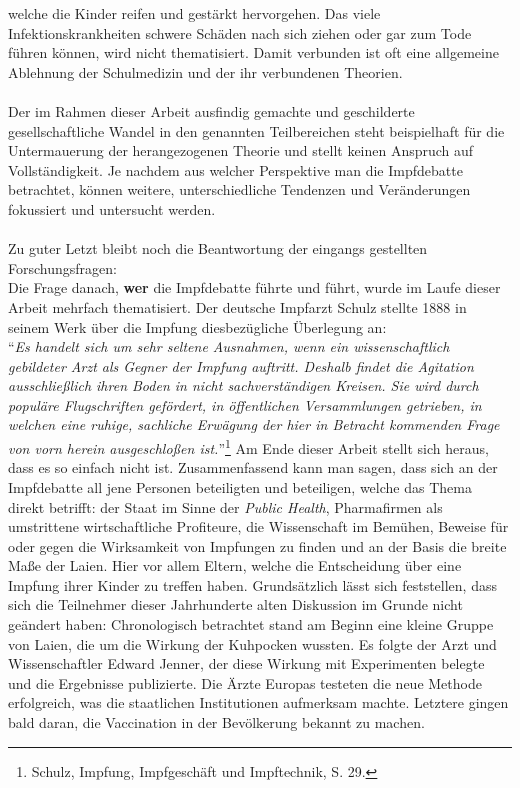 \documentclass[
    a4paper,
    12pt,
    hyphens,
    chapterprefix=true,
    headheight=33pt,
    footheight=29pt,
    headings=optiontohead, %
]{scrartcl}
\begin{document}
{welche die Kinder reifen und gestärkt hervorgehen. Das viele 
Infektionskrankheiten schwere Schäden nach sich ziehen oder gar zum 
Tode führen können, wird nicht thematisiert. Damit verbunden ist oft eine 
allgemeine Ablehnung der Schulmedizin und der ihr verbundenen Theorien. \\
\\
Der im Rahmen dieser Arbeit ausfindig gemachte und geschilderte gesellschaftliche Wandel in den genannten Teilbereichen steht beispielhaft für die Untermauerung der herangezogenen Theorie und stellt keinen Anspruch auf Vollständigkeit. Je nachdem aus welcher Perspektive man die Impfdebatte betrachtet, können weitere, unterschiedliche Tendenzen und Veränderungen fokussiert und untersucht werden. \\
\\ 
Zu guter Letzt bleibt noch die Beantwortung der eingangs gestellten Forschungsfragen:\\
Die Frage danach, \textbf{wer} die Impfdebatte führte und führt, wurde im Laufe dieser Arbeit mehrfach  thematisiert. Der deutsche Impfarzt Schulz stellte 1888 in seinem Werk über die Impfung diesbezügliche Überlegung an:\\
"`\textit{Es handelt sich um sehr seltene Ausnahmen, wenn ein wissenschaftlich gebildeter Arzt als Gegner der Impfung auftritt. Deshalb findet die Agitation ausschließlich ihren Boden in nicht sachverständigen Kreisen. Sie wird durch populäre Flugschriften gefördert, in öffentlichen Versammlungen getrieben, in welchen eine ruhige, sachliche Erwägung der hier in Betracht kommenden Frage von vorn herein ausgeschloßen ist.}"'\footnote{Schulz, Impfung, Impfgeschäft und Impftechnik, S. 29.} 
Am Ende dieser Arbeit stellt sich heraus, dass es so einfach nicht ist. Zusammenfassend kann man sagen, dass sich an der Impfdebatte all jene Personen beteiligten und beteiligen, welche das Thema direkt betrifft: der Staat im Sinne der \textit{Public Health}, Pharmafirmen als umstrittene wirtschaftliche Profiteure, die Wissenschaft im Bemühen, Beweise für oder gegen die Wirksamkeit von Impfungen zu finden und an der Basis die breite Maße der Laien. Hier vor allem Eltern, welche die Entscheidung über eine Impfung ihrer Kinder zu treffen haben. Grundsätzlich lässt sich feststellen, dass sich die Teilnehmer dieser Jahrhunderte alten Diskussion im Grunde nicht geändert haben: Chronologisch betrachtet stand am Beginn eine kleine Gruppe von Laien, die um die Wirkung der Kuhpocken wussten. Es folgte der Arzt und Wissenschaftler Edward Jenner, der diese Wirkung mit Experimenten belegte und die Ergebnisse publizierte. Die Ärzte Europas testeten die neue Methode erfolgreich, was die staatlichen Institutionen aufmerksam machte. Letztere gingen bald daran, die Vaccination in der Bevölkerung bekannt zu machen. \\ 
}
\end{document}
